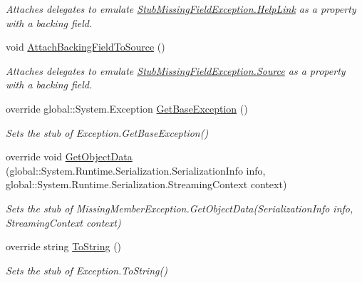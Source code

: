 \begin{DoxyCompactItemize}
\begin{DoxyCompactList}\small\item\em Attaches delegates to emulate \hyperlink{class_system_1_1_fakes_1_1_stub_missing_field_exception_a82de737817fa39c080057e6aa7ddfea3}{Stub\-Missing\-Field\-Exception.\-Help\-Link} as a property with a backing field.\end{DoxyCompactList}\item 
void \hyperlink{class_system_1_1_fakes_1_1_stub_missing_field_exception_af19bd6f55f0bf05cf691e4c40b1eb54d}{Attach\-Backing\-Field\-To\-Source} ()
\begin{DoxyCompactList}\small\item\em Attaches delegates to emulate \hyperlink{class_system_1_1_fakes_1_1_stub_missing_field_exception_a2bdfedfa53df4a16e8d9d125276905ad}{Stub\-Missing\-Field\-Exception.\-Source} as a property with a backing field.\end{DoxyCompactList}\item 
override global\-::\-System.\-Exception \hyperlink{class_system_1_1_fakes_1_1_stub_missing_field_exception_a6c656d2f1bd6f9cad0a71db39d9704d9}{Get\-Base\-Exception} ()
\begin{DoxyCompactList}\small\item\em Sets the stub of Exception.\-Get\-Base\-Exception()\end{DoxyCompactList}\item 
override void \hyperlink{class_system_1_1_fakes_1_1_stub_missing_field_exception_a3c1620d2ef5c607aae43b9beb66c0905}{Get\-Object\-Data} (global\-::\-System.\-Runtime.\-Serialization.\-Serialization\-Info info, global\-::\-System.\-Runtime.\-Serialization.\-Streaming\-Context context)
\begin{DoxyCompactList}\small\item\em Sets the stub of Missing\-Member\-Exception.\-Get\-Object\-Data(\-Serialization\-Info info, Streaming\-Context context)\end{DoxyCompactList}\item 
override string \hyperlink{class_system_1_1_fakes_1_1_stub_missing_field_exception_adca6687bf6a0bf3b250f0bc6f656119d}{To\-String} ()
\begin{DoxyCompactList}\small\item\em Sets the stub of Exception.\-To\-String()\end{DoxyCompactList}\end{DoxyCompactItemize}
